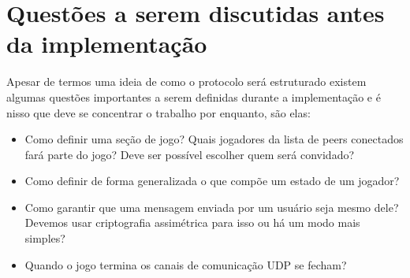 \documentclass{article}
\begin{document}
\section{Questões a serem discutidas antes da implementação}
Apesar de termos uma ideia de como o protocolo será estruturado existem algumas questões
importantes a serem definidas durante a implementação e é nisso que deve se concentrar o
trabalho por enquanto, são elas:
\begin{itemize}
\item Como definir uma seção de jogo? Quais jogadores da lista de peers conectados 
fará parte do jogo? Deve ser possível escolher quem será convidado?
\item Como definir de forma generalizada o que compõe um estado de um jogador?
\item Como garantir que uma mensagem enviada por um usuário seja mesmo dele?
Devemos usar criptografia assimétrica para isso ou há um modo mais simples?
\item Quando o jogo termina os canais de comunicação UDP se fecham?
\end{itemize}
\end{document}

